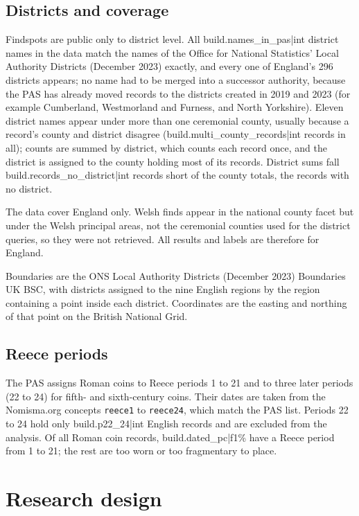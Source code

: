\documentclass[11pt,a4paper]{article}
\begin{document}
\subsection{Districts and coverage}
Findspots are public only to district level. All {{build.names_in_pas|int}} district names in the data match the names of the Office for National Statistics' Local Authority Districts (December 2023) exactly, and every one of England's 296 districts appears; no name had to be merged into a successor authority, because the PAS has already moved records to the districts created in 2019 and 2023 (for example Cumberland, Westmorland and Furness, and North Yorkshire). Eleven district names appear under more than one ceremonial county, usually because a record's county and district disagree ({{build.multi_county_records|int}} records in all); counts are summed by district, which counts each record once, and the district is assigned to the county holding most of its records. District sums fall {{build.records_no_district|int}} records short of the county totals, the records with no district.

The data cover England only. Welsh finds appear in the national county facet but under the Welsh principal areas, not the ceremonial counties used for the district queries, so they were not retrieved. All results and labels are therefore for England.

Boundaries are the ONS Local Authority Districts (December 2023) Boundaries UK BSC, with districts assigned to the nine English regions by the region containing a point inside each district. Coordinates are the easting and northing of that point on the British National Grid.

\subsection{Reece periods}
The PAS assigns Roman coins to Reece periods 1 to 21 and to three later periods (22 to 24) for fifth- and sixth-century coins. Their dates are taken from the Nomisma.org concepts \texttt{reece1} to \texttt{reece24}, which match the PAS list. Periods 22 to 24 hold only {{build.p22_24|int}} English records and are excluded from the analysis. Of all Roman coin records, {{build.dated_pc|f1}}\% have a Reece period from 1 to 21; the rest are too worn or too fragmentary to place.

\section{Research design}\label{sec:design}
\end{document}
